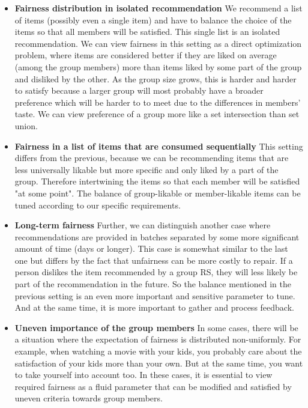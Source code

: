 \begin{itemize}
    \item \textbf{Fairness distribution in isolated recommendation}\newline
    We recommend a list of items (possibly even a single item) and have to balance the choice of the items so that all members will be satisfied. This single list is an isolated recommendation. We can view fairness in this setting as a direct optimization problem, where items are considered better if they are liked on average (among the group members) more than items liked by some part of the group and disliked by the other. As the group size grows, this is harder and harder to satisfy because a larger group will most probably have a broader preference which will be harder to to meet due to the differences in members' taste. We can view preference of a group more like a set intersection than set union.
    
    \item \textbf{Fairness in a list of items that are consumed sequentially}
    This setting differs from the previous, because we can be recommending items that are less universally likable but more specific and only liked by a part of the group. Therefore intertwining the items so that each member will be satisfied "at some point". The balance of group-likable or member-likable items can be tuned according to our specific requirements.
    
    \item \textbf{Long-term fairness}\newline
    Further, we can distinguish another case where recommendations are provided in batches separated by some more significant amount of time (days or longer). This case is somewhat similar to the last one but differs by the fact that unfairness can be more costly to repair. If a person dislikes the item recommended by a group RS, they will less likely be part of the recommendation in the future. So the balance mentioned in the previous setting is an even more important and sensitive parameter to tune. And at the same time, it is more important to gather and process feedback.
    
    \item \textbf{Uneven importance of the group members}
    In some cases, there will be a situation where the expectation of fairness is distributed non-uniformly. For example, when watching a movie with your kids, you probably care about the satisfaction of your kids more than your own. But at the same time, you want to take yourself into account too. In these cases, it is essential to view required fairness as a fluid parameter that can be modified and satisfied by uneven criteria towards group members.
    

\end{itemize}
